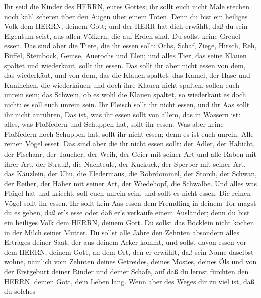  Ihr seid die Kinder des HERRN, eures Gottes; ihr sollt euch
nicht Male stechen noch kahl scheren über den Augen über einem Toten.
 Denn du bist ein heiliges Volk dem HERRN, deinem Gott; und
der HERR hat dich erwählt, daß du sein Eigentum seist, aus allen
Völkern, die auf Erden sind.  Du sollst keine Greuel essen.
 Das sind aber die Tiere, die ihr essen sollt: Ochs, Schaf,
Ziege,  Hirsch, Reh, Büffel, Steinbock, Gemse, Auerochs und
Elen;  und alles Tier, das seine Klauen spaltet und
wiederkäut, sollt ihr essen.  Das sollt ihr aber nicht essen
von dem, das wiederkäut, und von dem, das die Klauen spaltet: das Kamel,
der Hase und Kaninchen, die wiederkäuen und doch ihre Klauen nicht
spalten, sollen euch unrein sein;  das Schwein, ob es wohl
die Klauen spaltet, so wiederkäut es doch nicht: es soll euch unrein
sein. Ihr Fleisch sollt ihr nicht essen, und ihr Aas sollt ihr nicht
anrühren,  Das ist, was ihr essen sollt von allem, das in
Wassern ist: alles, was Floßfedern und Schuppen hat, sollt ihr essen.
 Was aber keine Floßfedern noch Schuppen hat, sollt ihr
nicht essen; denn es ist euch unrein.  Alle reinen Vögel
esset.  Das sind aber die ihr nicht essen sollt: der Adler,
der Habicht, der Fischaar,  der Taucher, der Weih, der
Geier mit seiner Art  und alle Raben mit ihrer Art,
 der Strauß, die Nachteule, der Kuckuck, der Sperber mit
seiner Art,  das Käuzlein, der Uhu, die Fledermaus,
 die Rohrdommel, der Storch, der Schwan,  der
Reiher, der Häher mit seiner Art, der Wiedehopf, die Schwalbe.
 Und alles was Flügel hat und kriecht, soll euch unrein
sein, und sollt es nicht essen.  Die reinen Vögel sollt ihr
essen.  Ihr sollt kein Aas essen-dem Fremdling in deinem
Tor magst du es geben, daß er's esse oder daß er's verkaufe einem
Ausländer; denn du bist ein heiliges Volk dem HERRN, deinem Gott. Du
sollst das Böcklein nicht kochen in der Milch seiner Mutter.
 Du sollst alle Jahre den Zehnten absondern alles Ertrages
deiner Saat, der aus deinem Acker kommt,  und sollst davon
essen vor dem HERRN, deinem Gott, an dem Ort, den er erwählt, daß sein
Name daselbst wohne, nämlich vom Zehnten deines Getreides, deines
Mostes, deines Öls und von der Erstgeburt deiner Rinder und deiner
Schafe, auf daß du lernst fürchten den HERRN, deinen Gott, dein Leben
lang.  Wenn aber des Weges dir zu viel ist, daß du solches
